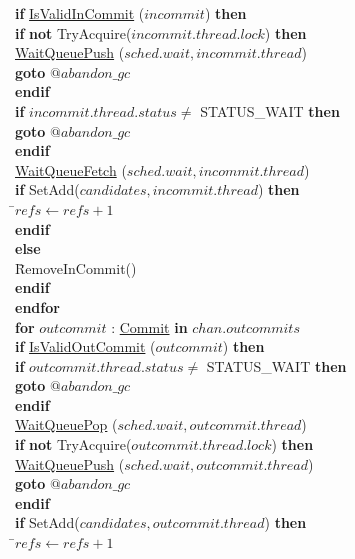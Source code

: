 \documentclass[a4paper,11pt]{article}
\newenvironment{program}{
  \begin{sffamily}
  \begin{scriptsize}
  \begin{tabbing}}
 {\end{tabbing}
  \end{scriptsize}
  \end{sffamily}}
\newcommand{\kw}[1]{\textsf{\textbf{#1}}}
\newcommand{\pindent}{\hspace{2em}\=}
\newcommand{\synchro}[1]{\textcolor{synchrocolor}{#1}}
\newcommand{\myref}[1]{
  \hyperref[#1]{#1}
}
\begin{document}
\begin{program}
  \>\>\>\pindent\kw{if} \myref{IsValidInCommit}($incommit$) \kw{then} \\
  \>\>\>\>\>\kw{if} \synchro{\kw{not} TryAcquire($incommit.thread.lock$)} \kw{then} \\
  \>\>\>\>\>\pindent\synchro{\myref{WaitQueuePush}($sched.wait, incommit.thread$)} \\
  \>\>\>\>\>\>\kw{goto} $@abandon\_gc$ \\
  \>\>\>\>\>\kw{endif} \\
  \>\>\>\>\pindent\kw{if} $incommit.thread.status \neq$ STATUS\_WAIT \kw{then} \\
  \>\>\>\>\>\pindent\kw{goto} $@abandon\_gc$ \\
  \>\>\>\>\>\kw{endif} \\
  \>\>\>\>\>\synchro{\myref{WaitQueueFetch}($sched.wait, incommit.thread$)} \\
  \>\>\>\>\>\kw{if} SetAdd($candidates, incommit.thread$) \kw{then} \\
  \>\>\>\>\>\pindent$refs \leftarrow refs + 1$ \\
  \>\>\>\>\>\kw{endif} \\
  \>\>\>\>\kw{else} \\
  \>\>\>\>\pindent RemoveInCommit() \\
  \>\>\>\>\kw{endif} \\
  \>\>\>\kw{endfor} \\
  \>\>\>\kw{for} $outcommit$ : \myref{Commit} \kw{in} $chan.outcommits$ \\
  \>\>\>\pindent\kw{if} \myref{IsValidOutCommit}($outcommit$) \kw{then} \\
  \>\>\>\>\pindent\kw{if} $outcommit.thread.status \neq$ STATUS\_WAIT \kw{then} \\
  \>\>\>\>\>\pindent\kw{goto} $@abandon\_gc$ \\
  \>\>\>\>\>\kw{endif} \\
  \>\>\>\>\>\synchro{\myref{WaitQueuePop}($sched.wait, outcommit.thread$)} \\
  \>\>\>\>\>\kw{if} \synchro{\kw{not} TryAcquire($outcommit.thread.lock$)} \kw{then} \\
  \>\>\>\>\>\pindent\synchro{\myref{WaitQueuePush}($sched.wait, outcommit.thread$)} \\
  \>\>\>\>\>\>\kw{goto} $@abandon\_gc$ \\
  \>\>\>\>\>\kw{endif} \\
  \>\>\>\>\>\kw{if} SetAdd($candidates, outcommit.thread$) \kw{then} \\
  \>\>\>\>\>\pindent$refs \leftarrow refs + 1$ \\

\end{program}
\end{document}

